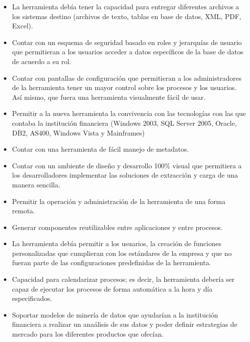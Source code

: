 \begin{itemize}
\item La herramienta debía tener la capacidad para entregar diferentes archivos
  a los sistemas destino (archivos de texto, tablas en base de datos, XML, PDF,
  Excel).

\item Contar con un esquema de seguridad basado en roles y jerarquías de usuario
  que permitieran a los usuarios acceder a datos específicos de la base de datos
  de acuerdo a su rol.

\item Contar con pantallas de configuración que permitieran a los
  administradores de la herramienta tener un mayor control sobre los procesos y
  los usuarios. Así mismo, que fuera una herramienta visualmente fácil de usar.

\item Permitir a la nueva herramienta la convivencia con las tecnologías con las
  que contaba la institución financiera (Windows 2003, SQL Server 2005, Oracle,
  DB2, AS400, Windows Vista y Mainframes)

\item Contar con una herramienta de fácil manejo de metadatos.

\item Contar con un ambiente de diseño y desarrollo 100\% visual que permitiera
  a los desarrolladores implementar las soluciones de extracción y carga de una
  manera sencilla.

\item Permitir la operación y administración de la herramienta de una forma
  remota.

\item Generar componentes reutilizables entre aplicaciones y entre procesos.

\item La herramienta debía permitir a los usuarios, la creación de funciones
  personalizadas que cumplieran con los estándares de la empresa y que no fueran
  parte de las configuraciones predefinidas de la herramienta.

\item Capacidad para calendarizar procesos; es decir, la herramienta debería ser
  capaz de ejecutar los procesos de forma automática a la hora y día
  especificados.

\item Soportar modelos de minería de datos que ayudarían a la institución
  financiera a realizar un anaálisis de sus datos y poder definir estrategias de
  mercado para los diferentes productos que ofecían.


\end{itemize}
